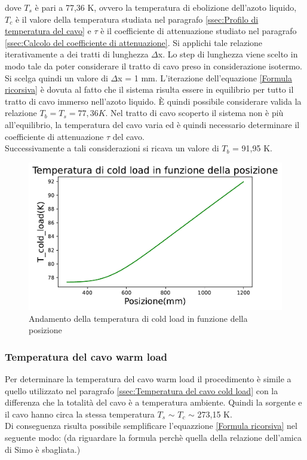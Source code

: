 dove $T_{s}$ è pari a 77,36 K, ovvero la temperatura di ebolizione dell'azoto liquido, $T_{c}$ è il valore della temperatura studiata nel paragrafo \ref{ssec:Profilo di temperatura del cavo} e $\tau$ è il coefficiente di attenuazione studiato nel paragrafo \ref{ssec:Calcolo del coefficiente di attenuazione}.
Si applichi tale relazione iterativamente a dei tratti di lunghezza $\Delta$x. Lo step di lunghezza viene scelto in modo tale da poter considerare il tratto di cavo preso in considerazione isotermo. Si scelga quindi un valore di $\Delta$x = 1 mm.
L'iterazione dell'equazione \eqref{Formula ricorsiva} è dovuta al fatto che il sistema risulta essere in equilibrio per tutto il tratto di cavo immerso nell'azoto liquido. \`E quindi possibile considerare valida la relazione $T_{b} = T_{s} = 77,36 K$. Nel tratto di cavo scoperto il sistema non è più all'equilibrio, la temperatura del cavo varia ed è quindi necessario determinare il coefficiente di attenuazione $\tau$ del cavo.\\
Successivamente a tali considerazioni si ricava un valore di $T_{b}$ = 91,95 K.

\begin{figure}[h]
	\centering
	\includegraphics[scale=0.8]{Temperatura_vs_posizione.pdf}
	\caption{Andamento della temperatura di cold load in funzione della posizione}
    	\label{fig:Temperatura_vs_posizione}
\end{figure}


\subsubsection{Temperatura del cavo warm load}
\label{ssec:Temperatura del cavo warm load}

Per determinare la temperatura del cavo warm load il procedimento è simile a quello utilizzato nel paragrafo \ref{ssec:Temperatura del cavo cold load} con la differenza che la totalità del cavo è a temperatura ambiente. Quindi la sorgente e il cavo hanno circa la stessa temperatura $T_{s}$ $\sim$ $T_{c}$ $\sim$ 273,15 K.\\
Di conseguenza risulta possibile semplificare l'equazzione \eqref{Formula ricorsiva} nel seguente modo:
(da riguardare la formula perchè quella della relazione dell'amica di Simo è sbagliata.)

